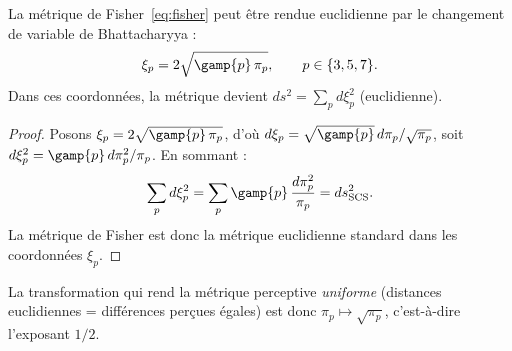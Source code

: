 \documentclass[12pt,a4paper]{article}
\begin{document}
\begin{derivedbox}
La m\'etrique de Fisher~\eqref{eq:fisher} peut \^etre rendue
euclidienne par le changement de variable de Bhattacharyya :
\begin{equation}
  \xi_p = 2\sqrt{\gamp{p}\,\pi_p}, \qquad p \in \{3, 5, 7\}.
  \label{eq:bhattacharyya}
\end{equation}
Dans ces coordonn\'ees, la m\'etrique devient
$ds^2 = \sum_p d\xi_p^2$ (euclidienne).

\begin{proof}
Posons $\xi_p = 2\sqrt{\gamp{p}\,\pi_p}$, d'o\`u
$d\xi_p = \sqrt{\gamp{p}}\,d\pi_p / \sqrt{\pi_p}$, soit
$d\xi_p^2 = \gamp{p}\,d\pi_p^2 / \pi_p$. En sommant :
\[
  \sum_p d\xi_p^2
  = \sum_p \gamp{p}\,\frac{d\pi_p^2}{\pi_p}
  = ds^2_{\mathrm{SCS}}.
\]
La m\'etrique de Fisher est donc la m\'etrique euclidienne standard
dans les coordonn\'ees $\xi_p$.
\end{proof}
\end{derivedbox}

La transformation qui rend la m\'etrique perceptive \emph{uniforme}
(distances euclidiennes = diff\'erences per\c{c}ues \'egales) est donc
$\pi_p \mapsto \sqrt{\pi_p}$, c'est-\`a-dire l'exposant $1/2$.
\end{document}
